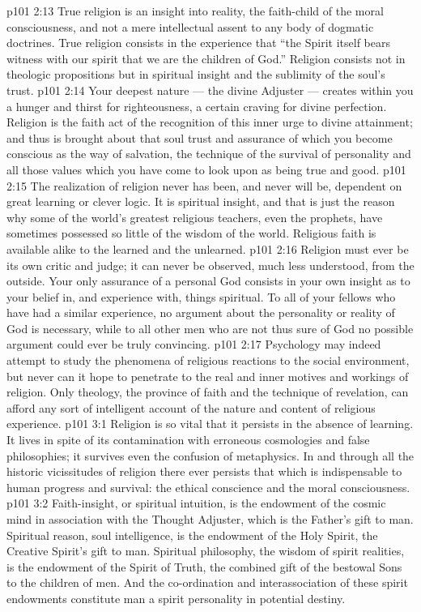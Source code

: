 \vs p101 2:13 True religion is an insight into reality, the faith\hyp{}child of the moral consciousness, and not a mere intellectual assent to any body of dogmatic doctrines. True religion consists in the experience that “the Spirit itself bears witness with our spirit that we are the children of God.” Religion consists not in theologic propositions but in spiritual insight and the sublimity of the soul’s trust.
\vs p101 2:14 Your deepest nature --- the divine Adjuster --- creates within you a hunger and thirst for righteousness, a certain craving for divine perfection. Religion is the faith act of the recognition of this inner urge to divine attainment; and thus is brought about that soul trust and assurance of which you become conscious as the way of salvation, the technique of the survival of personality and all those values which you have come to look upon as being true and good.
\vs p101 2:15 \pc The realization of religion never has been, and never will be, dependent on great learning or clever logic. It is spiritual insight, and that is just the reason why some of the world’s greatest religious teachers, even the prophets, have sometimes possessed so little of the wisdom of the world. Religious faith is available alike to the learned and the unlearned.
\vs p101 2:16 Religion must ever be its own critic and judge; it can never be observed, much less understood, from the outside. Your only assurance of a personal God consists in your own insight as to your belief in, and experience with, things spiritual. To all of your fellows who have had a similar experience, no argument about the personality or reality of God is necessary, while to all other men who are not thus sure of God no possible argument could ever be truly convincing.
\vs p101 2:17 Psychology may indeed attempt to study the phenomena of religious reactions to the social environment, but never can it hope to penetrate to the real and inner motives and workings of religion. Only theology, the province of faith and the technique of revelation, can afford any sort of intelligent account of the nature and content of religious experience.
\vs p101 3:1 Religion is so vital that it persists in the absence of learning. It lives in spite of its contamination with erroneous cosmologies and false philosophies; it survives even the confusion of metaphysics. In and through all the historic vicissitudes of religion there ever persists that which is indispensable to human progress and survival: the ethical conscience and the moral consciousness.
\vs p101 3:2 Faith\hyp{}insight, or spiritual intuition, is the endowment of the cosmic mind in association with the Thought Adjuster, which is the Father’s gift to man. Spiritual reason, soul intelligence, is the endowment of the Holy Spirit, the Creative Spirit’s gift to man. Spiritual philosophy, the wisdom of spirit realities, is the endowment of the Spirit of Truth, the combined gift of the bestowal Sons to the children of men. And the co\hyp{}ordination and interassociation of these spirit endowments constitute man a spirit personality in potential destiny.
